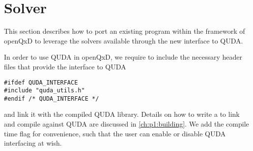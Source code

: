 
\chapter{Solver}
\label{ch:p1:solver}

This section describes how to port an existing program within the framework of openQxD to leverage the solvers available through the new interface to QUDA.

In order to use QUDA in openQxD, we require to include the necessary header files that provide the interface to QUDA
\begin{verbatim}
#ifdef QUDA_INTERFACE
#include "quda_utils.h"
#endif /* QUDA_INTERFACE */
\end{verbatim}
and link it with the compiled QUDA library. Details on how to write a  to link and compile against QUDA are discussed in \cref{ch:p1:building}. We add the compile time flag  for convenience, such that the user can enable or disable QUDA interfacing at wish.

